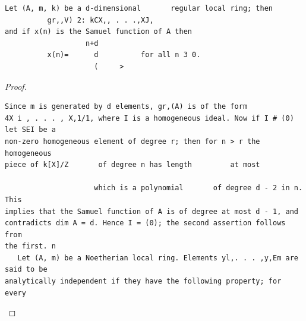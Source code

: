 \begin{theorem}\label{mcrt-auto-theorem-14-4}\uses{}
\begin{verbatim}
Let (A, m, k) be a d-dimensional       regular local ring; then
          gr,,V) 2: kCX,, . . .,XJ,
and if x(n) is the Samuel function of A then
                   n+d
          x(n)=      d          for all n 3 0.
                     (     >
\end{verbatim}
\end{theorem}
\begin{proof}
\begin{verbatim}
Since m is generated by d elements, gr,(A) is of the form
4X i , . . . , X,1/1, where I is a homogeneous ideal. Now if I # (0) let SEI be a
non-zero homogeneous element of degree r; then for n > r the homogeneous
piece of k[X]/Z       of degree n has length         at most

                     which is a polynomial       of degree d - 2 in n. This
implies that the Samuel function of A is of degree at most d - 1, and
contradicts dim A = d. Hence I = (0); the second assertion follows from
the first. n
   Let (A, m) be a Noetherian local ring. Elements yl,. . . ,y,Em are said to be
analytically independent if they have the following property; for every
\end{verbatim}
\end{proof}


